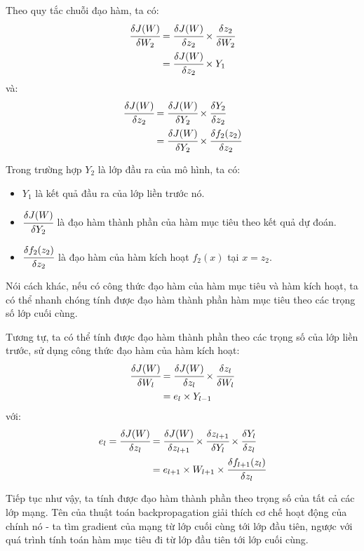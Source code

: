 \documentclass[12pt]{extreport}
\begin{document}
Theo quy tắc chuỗi đạo hàm, ta có:
\begin{align*}
    \cfrac{\delta J(W)}{\delta W_2} & = \cfrac{\delta J(W)}{\delta z_2} \times \cfrac{\delta z_2}{\delta W_2} \\
                                    & = \cfrac{\delta J(W)}{\delta z_2} \times Y_1
\end{align*}
và:
\begin{align*}
    \cfrac{\delta J(W)}{\delta z_2} & = \cfrac{\delta J(W)}{\delta Y_2} \times \cfrac{\delta Y_2}{\delta z_2}      \\
                                    & = \cfrac{\delta J(W)}{\delta Y_2} \times \cfrac{\delta f_2(z_2)}{\delta z_2}
\end{align*}

Trong trường hợp $ Y_2 $ là lớp đầu ra của mô hình, ta có:
\begin{itemize}
    \item $ Y_1 $ là kết quả đầu ra của lớp liền trước nó.
    \item $ \cfrac{\delta J(W)}{\delta Y_2} $ là đạo hàm thành phần của hàm mục tiêu theo kết quả dự đoán.
    \item $ \cfrac{\delta f_2(z_2)}{\delta z_2} $ là đạo hàm của hàm kích hoạt $ f_2(x) $ tại $ x = z_2 $.
\end{itemize}

Nói cách khác, nếu có công thức đạo hàm của hàm mục tiêu và hàm kích hoạt, ta có thể nhanh chóng tính được đạo hàm thành phần hàm mục tiêu theo các trọng số lớp cuối cùng.

Tương tự, ta có thể tính được đạo hàm thành phần theo các trọng số của lớp liền trước, sử dụng công thức đạo hàm của hàm kích hoạt:
\begin{align*}
    \cfrac{\delta J(W)}{\delta W_l} & = \cfrac{\delta J(W)}{\delta z_l} \times \cfrac{\delta z_l}{\delta W_l} \\
                                    & = e_l \times Y_{l - 1}
\end{align*}
với:
\begin{align*}
    e_l = \cfrac{\delta J(W)}{\delta z_l} & = \cfrac{\delta J(W)}{\delta z_{l + 1}} \times \cfrac{\delta z_{l + 1}}{\delta Y_l} \times \cfrac{\delta Y_l}{\delta z_l} \\
                                          & = e_{l + 1} \times W_{l + 1} \times \cfrac{\delta f_{l + 1}(z_l)}{\delta z_l}
\end{align*}

Tiếp tục như vậy, ta tính được đạo hàm thành phần theo trọng số của tất cả các lớp mạng. Tên của thuật toán backpropagation giải thích cơ chế hoạt động của chính nó - ta tìm gradient của mạng từ lớp cuối cùng tới lớp đầu tiên, ngược với quá trình tính toán hàm mục tiêu đi từ lớp đầu tiên tới lớp cuối cùng.
\end{document}
